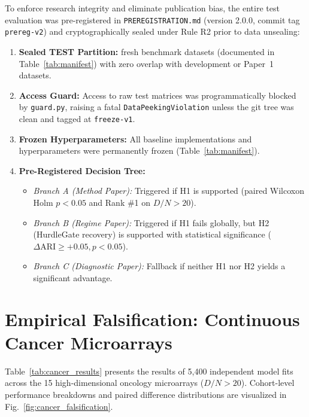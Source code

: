 \documentclass[preprint,12pt]{elsarticle}
\begin{document}
To enforce research integrity and eliminate publication bias, the entire test evaluation was pre-registered in \texttt{PREREGISTRATION.md} (version 2.0.0, commit tag \texttt{prereg-v2}) and cryptographically sealed under Rule R2 prior to data unsealing:
\begin{enumerate}
    \item \textbf{Sealed TEST Partition:} \TotalTestDatasets{} fresh benchmark datasets (documented in Table~\ref{tab:manifest}) with zero overlap with development or Paper~1 datasets.
    \item \textbf{Access Guard:} Access to raw test matrices was programmatically blocked by \texttt{guard.py}, raising a fatal \texttt{DataPeekingViolation} unless the git tree was clean and tagged at \texttt{freeze-v1}.
    \item \textbf{Frozen Hyperparameters:} All baseline implementations and hyperparameters were permanently frozen (Table~\ref{tab:manifest}).
    \item \textbf{Pre-Registered Decision Tree:}
    \begin{itemize}
        \item \textit{Branch A (Method Paper):} Triggered if H1 is supported (paired Wilcoxon Holm $p < 0.05$ and Rank \#1 on $D/N > 20$).
        \item \textit{Branch B (Regime Paper):} Triggered if H1 fails globally, but H2 (HurdleGate recovery) is supported with statistical significance ($\Delta\text{ARI} \ge +0.05, p < 0.05$).
        \item \textit{Branch C (Diagnostic Paper):} Fallback if neither H1 nor H2 yields a significant advantage.
    \end{itemize}
\end{enumerate}



\section{Empirical Falsification: Continuous Cancer Microarrays}\label{sec:cancer_falsification}

Table~\ref{tab:cancer_results} presents the results of 5,400 independent model fits across the 15 high-dimensional oncology microarrays ($D/N > 20$). Cohort-level performance breakdowns and paired difference distributions are visualized in Fig.~\ref{fig:cancer_falsification}.
\end{document}
